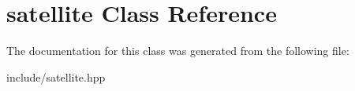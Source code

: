 \hypertarget{classsatellite}{}\section{satellite Class Reference}
\label{classsatellite}


The documentation for this class was generated from the following file\+:\begin{DoxyCompactItemize}
\item 
include/satellite.\+hpp\end{DoxyCompactItemize}
